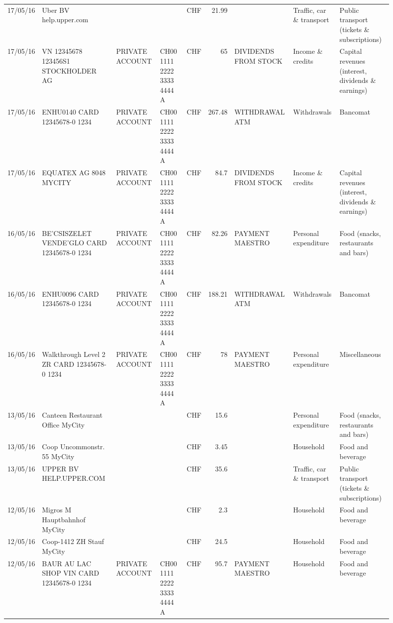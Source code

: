 \begin{landscape}
\begin{sidewaysfigure}
\begin{table}[h]
\begin{center}
\begin{tabular}{rllllrlll}
		17/05/16 & Uber BV                  help.upper.com &       &       & CHF   & 21.99 &       & Traffic, car \& transport & Public transport (tickets \& subscriptions) \\
		17/05/16 & VN 12345678     123456S1 STOCKHOLDER AG & PRIVATE ACCOUNT & CH00 1111 2222 3333 4444 A & CHF   & 65    & DIVIDENDS FROM STOCK & Income \& credits & Capital revenues (interest, dividends \& earnings) \\
		17/05/16 & ENHU0140 CARD 12345678-0 1234 & PRIVATE ACCOUNT & CH00 1111 2222 3333 4444 A & CHF   & 267.48 & WITHDRAWAL ATM & Withdrawals & Bancomat \\
		17/05/16 & EQUATEX AG 8048 MYCITY & PRIVATE ACCOUNT & CH00 1111 2222 3333 4444 A & CHF   & 84.7  & DIVIDENDS FROM STOCK & Income \& credits & Capital revenues (interest, dividends \& earnings) \\
		16/05/16 & BE'CSISZELET VENDE'GLO CARD 12345678-0 1234 & PRIVATE ACCOUNT & CH00 1111 2222 3333 4444 A & CHF   & 82.26 & PAYMENT MAESTRO & Personal expenditure & Food (snacks, restaurants and bars) \\
		16/05/16 & ENHU0096 CARD 12345678-0 1234 & PRIVATE ACCOUNT & CH00 1111 2222 3333 4444 A & CHF   & 188.21 & WITHDRAWAL ATM & Withdrawals & Bancomat \\
		16/05/16 & Walkthrough Level 2 ZR CARD 12345678-0 1234 & PRIVATE ACCOUNT & CH00 1111 2222 3333 4444 A & CHF   & 78    & PAYMENT MAESTRO & Personal expenditure & Miscellaneous \\
		13/05/16 & Canteen Restaurant Office      MyCity &       &       & CHF   & 15.6  &       & Personal expenditure & Food (snacks, restaurants and bars) \\
		13/05/16 & Coop Uncommonstr. 55   MyCity &       &       & CHF   & 3.45  &       & Household & Food and beverage \\
		13/05/16 & UPPER BV                  HELP.UPPER.COM &       &       & CHF   & 35.6  &       & Traffic, car \& transport & Public transport (tickets \& subscriptions) \\
		12/05/16 & Migros M Hauptbahnhof    MyCity &       &       & CHF   & 2.3   &       & Household & Food and beverage \\
		12/05/16 & Coop-1412 ZH Stauf       MyCity &       &       & CHF   & 24.5  &       & Household & Food and beverage \\
		12/05/16 & BAUR AU LAC SHOP VIN CARD 12345678-0 1234 & PRIVATE ACCOUNT & CH00 1111 2222 3333 4444 A & CHF   & 95.7  & PAYMENT MAESTRO & Household & Food and beverage \\

\end{tabular}
\end{center}
\end{table}
\end{sidewaysfigure}
\end{landscape}
